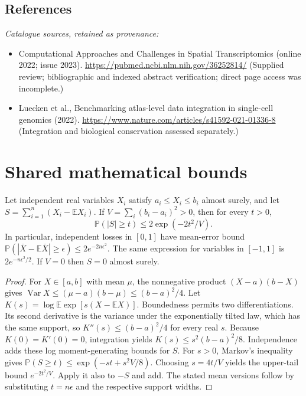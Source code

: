 \documentclass[11pt]{article}
\begin{document}
\subsection{References}
\noindent\emph{Catalogue sources, retained as provenance:}
\begin{itemize}
\item Computational Approaches and Challenges in Spatial Transcriptomics (online 2022; issue 2023). \url{https://pubmed.ncbi.nlm.nih.gov/36252814/} (Supplied review; bibliographic and indexed abstract verification; direct page access was incomplete.)
\item Luecken et al., Benchmarking atlas-level data integration in single-cell genomics (2022). \url{https://www.nature.com/articles/s41592-021-01336-8} (Integration and biological conservation assessed separately.)
\end{itemize}




\section{Shared mathematical bounds}\label{app:bounds}
\begin{lemma}\label{lem:bounded}
Let independent real variables $X_i$ satisfy $a_i\leq X_i\leq b_i$ almost surely,
and let $S=\sum_{i=1}^n(X_i-\mathbb{E} X_i)$. If
$V=\sum_i(b_i-a_i)^2>0$, then for every $t>0$,
\[
 \mathbb{P}(|S|\geq t)\leq 2\exp(-2t^2/V).
\]
In particular, independent losses in $[0,1]$ have mean-error bound
$\mathbb{P}(|\overline X-\mathbb{E}\overline X|\geq\epsilon)
\leq2e^{-2n\epsilon^2}$. The same expression for variables in $[-1,1]$
is $2e^{-n\epsilon^2/2}$. If $V=0$ then $S=0$ almost surely.
\end{lemma}
\begin{proof}
For $X\in[a,b]$ with mean $\mu$, the nonnegative product
$(X-a)(b-X)$ gives
$\operatorname{Var} X\leq(\mu-a)(b-\mu)\leq(b-a)^2/4$.
Let $K(s)=\log\mathbb{E}\exp[s(X-\mathbb{E} X)]$.
Boundedness permits two differentiations. Its second derivative is the variance
under the exponentially tilted law, which has the same support, so
$K''(s)\leq(b-a)^2/4$ for every real $s$.
Because $K(0)=K'(0)=0$, integration yields
$K(s)\leq s^2(b-a)^2/8$.
Independence adds these log moment-generating bounds for $S$.
For $s>0$, Markov's inequality gives
$\mathbb{P}(S\geq t)\leq\exp(-st+s^2V/8)$.
Choosing $s=4t/V$ yields the upper-tail bound $e^{-2t^2/V}$.
Apply it also to $-S$ and add. The stated mean versions follow by substituting
$t=n\epsilon$ and the respective support widths.
\end{proof}
\end{document}
